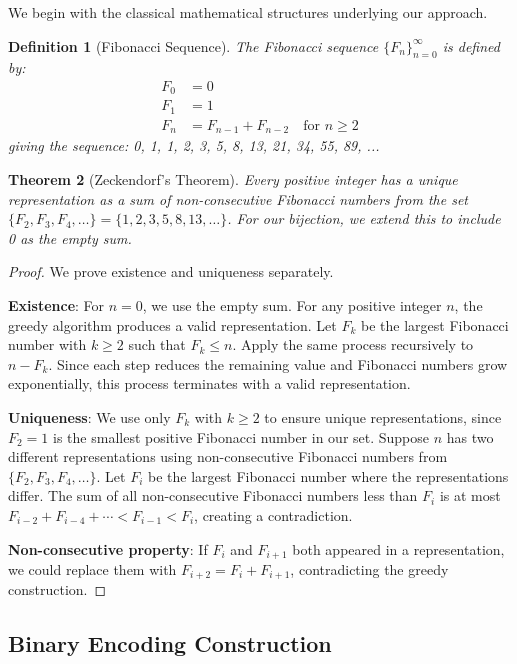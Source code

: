 \documentclass[12pt,letterpaper]{article}
\newtheorem{theorem}{Theorem}[section]
\newtheorem{definition}[theorem]{Definition}
\begin{document}
We begin with the classical mathematical structures underlying our approach.

\begin{definition}[Fibonacci Sequence]
The Fibonacci sequence $\{F_n\}_{n=0}^{\infty}$ is defined by:
\begin{align}
F_0 &= 0 \\
F_1 &= 1 \\
F_n &= F_{n-1} + F_{n-2} \quad \text{for } n \geq 2
\end{align}
giving the sequence: 0, 1, 1, 2, 3, 5, 8, 13, 21, 34, 55, 89, ...
\end{definition}

\begin{theorem}[Zeckendorf's Theorem]
\label{thm:zeckendorf}
Every positive integer has a unique representation as a sum of non-consecutive Fibonacci numbers from the set $\{F_2, F_3, F_4, \ldots\} = \{1, 2, 3, 5, 8, 13, \ldots\}$. For our bijection, we extend this to include 0 as the empty sum.
\end{theorem}

\begin{proof}
We prove existence and uniqueness separately.

\textbf{Existence}: For $n = 0$, we use the empty sum. For any positive integer $n$, the greedy algorithm produces a valid representation. Let $F_k$ be the largest Fibonacci number with $k \geq 2$ such that $F_k \leq n$. Apply the same process recursively to $n - F_k$. Since each step reduces the remaining value and Fibonacci numbers grow exponentially, this process terminates with a valid representation.

\textbf{Uniqueness}: We use only $F_k$ with $k \geq 2$ to ensure unique representations, since $F_2 = 1$ is the smallest positive Fibonacci number in our set. Suppose $n$ has two different representations using non-consecutive Fibonacci numbers from $\{F_2, F_3, F_4, \ldots\}$. Let $F_i$ be the largest Fibonacci number where the representations differ. The sum of all non-consecutive Fibonacci numbers less than $F_i$ is at most $F_{i-2} + F_{i-4} + \cdots < F_{i-1} < F_i$, creating a contradiction.

\textbf{Non-consecutive property}: If $F_i$ and $F_{i+1}$ both appeared in a representation, we could replace them with $F_{i+2} = F_i + F_{i+1}$, contradicting the greedy construction.
\end{proof}

\subsection{Binary Encoding Construction}
\end{document}
